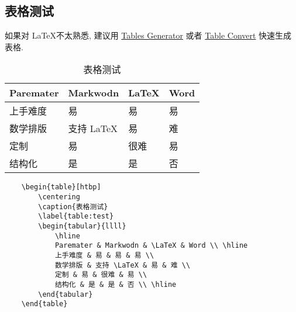 \subsection{表格测试}
如果对 \LaTeX 不太熟悉, 建议用 \href{https://www.tablesgenerator.com/}{Tables Generator} 或者 \href{https://tableconvert.com/}{Table Convert} 快速生成表格.
\begin{table}[htbp]
    \centering
    \caption{表格测试}
    \label{table:test}
    \begin{tabular}{llll}
        \hline
        Paremater & Markwodn & \LaTeX & Word \\ \hline
        上手难度 & 易 & 易 & 易 \\
        数学排版 & 支持 \LaTeX & 易 & 难 \\
        定制 & 易 & 很难 & 易 \\
        结构化 & 是 & 是 & 否 \\ \hline
    \end{tabular}
\end{table}
\begin{lstlisting}
    \begin{table}[htbp]
        \centering
        \caption{表格测试}
        \label{table:test}
        \begin{tabular}{llll}
            \hline
            Paremater & Markwodn & \LaTeX & Word \\ \hline
            上手难度 & 易 & 易 & 易 \\
            数学排版 & 支持 \LaTeX & 易 & 难 \\
            定制 & 易 & 很难 & 易 \\
            结构化 & 是 & 是 & 否 \\ \hline
        \end{tabular}
    \end{table}
\end{lstlisting}